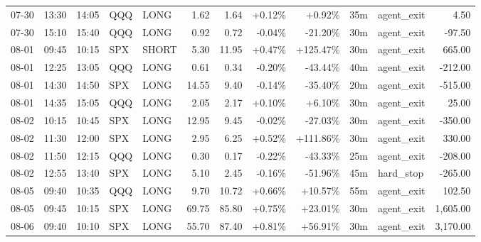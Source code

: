 \documentclass[11pt,a4paper,twoside]{article}
\begin{document}
\begin{center}
\begin{longtable}{>{\color{txtmain}}l l l l l r r r r r >{\color{txtmain}}l r}
07-30 & 13:30 & 14:05 & QQQ & LONG & 1.62 & 1.64 & \textcolor{wingreen}{+0.12\%} & \textcolor{wingreen}{+0.92\%} & 35m & agent\_exit & \textcolor{wingreen}{4.50} \\
07-30 & 15:10 & 15:40 & QQQ & LONG & 0.92 & 0.72 & \textcolor{lossred}{-0.04\%} & \textcolor{lossred}{-21.20\%} & 30m & agent\_exit & \textcolor{lossred}{-97.50} \\
08-01 & 09:45 & 10:15 & SPX & SHORT & 5.30 & 11.95 & \textcolor{wingreen}{+0.47\%} & \textcolor{wingreen}{+125.47\%} & 30m & agent\_exit & \textcolor{wingreen}{665.00} \\
08-01 & 12:25 & 13:05 & QQQ & LONG & 0.61 & 0.34 & \textcolor{lossred}{-0.20\%} & \textcolor{lossred}{-43.44\%} & 40m & agent\_exit & \textcolor{lossred}{-212.00} \\
08-01 & 14:30 & 14:50 & SPX & LONG & 14.55 & 9.40 & \textcolor{lossred}{-0.14\%} & \textcolor{lossred}{-35.40\%} & 20m & agent\_exit & \textcolor{lossred}{-515.00} \\
08-01 & 14:35 & 15:05 & QQQ & LONG & 2.05 & 2.17 & \textcolor{wingreen}{+0.10\%} & \textcolor{wingreen}{+6.10\%} & 30m & agent\_exit & \textcolor{wingreen}{25.00} \\
08-02 & 10:15 & 10:45 & SPX & LONG & 12.95 & 9.45 & \textcolor{lossred}{-0.02\%} & \textcolor{lossred}{-27.03\%} & 30m & agent\_exit & \textcolor{lossred}{-350.00} \\
08-02 & 11:30 & 12:00 & SPX & LONG & 2.95 & 6.25 & \textcolor{wingreen}{+0.52\%} & \textcolor{wingreen}{+111.86\%} & 30m & agent\_exit & \textcolor{wingreen}{330.00} \\
08-02 & 11:50 & 12:15 & QQQ & LONG & 0.30 & 0.17 & \textcolor{lossred}{-0.22\%} & \textcolor{lossred}{-43.33\%} & 25m & agent\_exit & \textcolor{lossred}{-208.00} \\
08-02 & 12:55 & 13:40 & SPX & LONG & 5.10 & 2.45 & \textcolor{lossred}{-0.16\%} & \textcolor{lossred}{-51.96\%} & 45m & hard\_stop & \textcolor{lossred}{-265.00} \\
08-05 & 09:40 & 10:35 & QQQ & LONG & 9.70 & 10.72 & \textcolor{wingreen}{+0.66\%} & \textcolor{wingreen}{+10.57\%} & 55m & agent\_exit & \textcolor{wingreen}{102.50} \\
08-05 & 09:45 & 10:15 & SPX & LONG & 69.75 & 85.80 & \textcolor{wingreen}{+0.75\%} & \textcolor{wingreen}{+23.01\%} & 30m & agent\_exit & \textcolor{wingreen}{1,605.00} \\
08-06 & 09:40 & 10:10 & SPX & LONG & 55.70 & 87.40 & \textcolor{wingreen}{+0.81\%} & \textcolor{wingreen}{+56.91\%} & 30m & agent\_exit & \textcolor{wingreen}{3,170.00} \\

\end{longtable}
\end{center}
\end{document}

